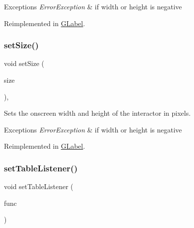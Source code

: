 \begin{DoxyExceptions}{Exceptions}
{\em Error\+Exception} & if width or height is negative \\
\hline
\end{DoxyExceptions}


Reimplemented in \mbox{\hyperlink{classGLabel_a8ba9af72c23f52d4b93096a13a11f150}{G\+Label}}.

\mbox{\label{classGInteractor_ae2b628228f192c2702c4ce941b2af68f}} 
\subsubsection{\texorpdfstring{set\+Size()}{setSize()}\hspace{0.1cm}{\footnotesize\ttfamily [2/2]}}
{\footnotesize\ttfamily void set\+Size (\begin{DoxyParamCaption}\item[{const \mbox{\hyperlink{structGDimension}{G\+Dimension}} \&}]{size }\end{DoxyParamCaption})\hspace{0.3cm}{\ttfamily [virtual]}, {\ttfamily [inherited]}}



Sets the onscreen width and height of the interactor in pixels. 


\begin{DoxyExceptions}{Exceptions}
{\em Error\+Exception} & if width or height is negative \\
\hline
\end{DoxyExceptions}


Reimplemented in \mbox{\hyperlink{classGLabel_a42d96e60c62d7770993327d7147d77b8}{G\+Label}}.

\mbox{\label{classGTable_aeeb00b5caf01028e9de6f2dd6ef4b9bd}} 
\subsubsection{\texorpdfstring{set\+Table\+Listener()}{setTableListener()}\hspace{0.1cm}{\footnotesize\ttfamily [1/2]}}
{\footnotesize\ttfamily void set\+Table\+Listener (\begin{DoxyParamCaption}\item[{G\+Event\+Listener}]{func }\end{DoxyParamCaption})\hspace{0.3cm}{\ttfamily [virtual]}}



